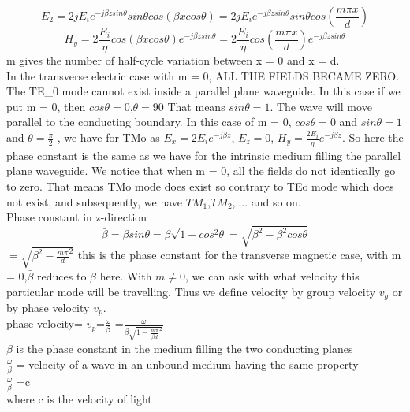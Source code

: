 \begin{dmath}
E_{2} = 2 jE_{i} e^{-j\beta zsin\theta} sin\theta cos(\beta xcos\theta) = 2 jE_{i} e^{-j\beta zsin\theta} sin\theta cos(\frac{m\pi x}{d})
\end{dmath}
\begin{dmath}
H_{y} = 2 \frac{E_{i}}{\eta} cos(\beta xcos\theta) e^{-j\beta zsin\theta} =2 \frac{E_{i}}{\eta} cos(\frac{m\pi x}{d}) e^{-j\beta zsin\theta} 
\end{dmath}
m gives the number of half-cycle variation between x = 0 and x = d.\\
In the transverse electric case with m = 0, ALL THE FIELDS BECAME ZERO.\\
The TE_0 mode cannot exist inside a parallel plane waveguide.
In this case if we put m = 0, then $cos\theta =0$,$\theta =90$ That means $sin\theta =1$.
The wave will move parallel to the conducting boundary. In this case of m = 0, $cos\theta =0$ and $sin\theta =1$ and $\theta=\frac{\pi}{2}$ , we have for TMo as $E_{x} =2E_{i} e^{-j\beta z}$, $E_{z}= 0$, $H_{y} =\frac{2E_{i}}{\eta} e^{-j\beta z}$. So here the phase constant is the same as we have for the intrinsic medium filling the parallel plane waveguide. We notice that when m = 0, all the fields do not identically go to zero. That means TMo mode does exist so contrary to TEo mode which does not exist, and subsequently, we have $TM_{1}$,$TM_{2}$,.... and so on.\\
Phase constant in z-direction\\
\begin{equation*}
\bar{\beta} = \beta sin\theta = \beta \sqrt{1- cos^{2}\theta} =\sqrt{\beta^{2} -\beta^{2}cos\theta}
\end{equation*}
$=\sqrt{\beta^{2} -\frac{m\pi}{d}^{2}}$
this is the phase constant for the transverse magnetic case, with m = 0,$\bar{\beta}$ reduces to $\beta$ here. With $m\neq 0$, we can ask with what velocity this particular mode will be travelling. Thus we define velocity by group velocity $v_{g}$ or by phase velocity $v_{p}$.\\
phase velocity= $v_{p}$=$\frac{\omega}{\beta}$ =$\frac{\omega}{\beta \sqrt{1- \frac{m \pi}{\beta d}^{2}}}$\\
$\beta$ is the phase constant in the medium filling the two conducting planes\\
$\frac{\omega}{\beta}$ = velocity of a wave in an unbound medium having the same property\\
$\frac{\omega}{\beta}$ =c\\
where c is the velocity of light\\
